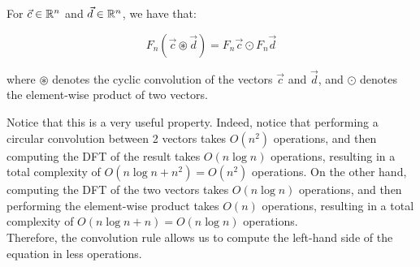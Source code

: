 \begin{theorem}
    For $\vec{c} \in \mathbb{R}^n$ and $\vec{d} \in \mathbb{R}^n$, we have that:

    $$F_n (\vec{c} \circledast \vec{d}) = F_n \vec{c} \odot F_n \vec{d}$$

    where $\circledast$ denotes the cyclic convolution of the vectors $\vec{c}$ and $\vec{d}$, and $\odot$ denotes
    the element-wise product of two vectors.
\end{theorem}

Notice that this is a very useful property. Indeed, notice that performing a circular convolution
between 2 vectors takes $O(n^2)$ operations, and then computing the DFT of the result takes $O(n \log n)$
operations, resulting in a total complexity of $O(n \log n + n^2) = O(n^2)$ operations. On the other 
hand, computing the DFT of the two vectors takes $O(n \log n)$ operations, and then performing the element-wise
product takes $O(n)$ operations, resulting in a total complexity of $O(n \log n + n) = O(n \log n)$ operations.\\

Therefore, the convolution rule allows us to compute the left-hand side of the equation in less
operations. 

